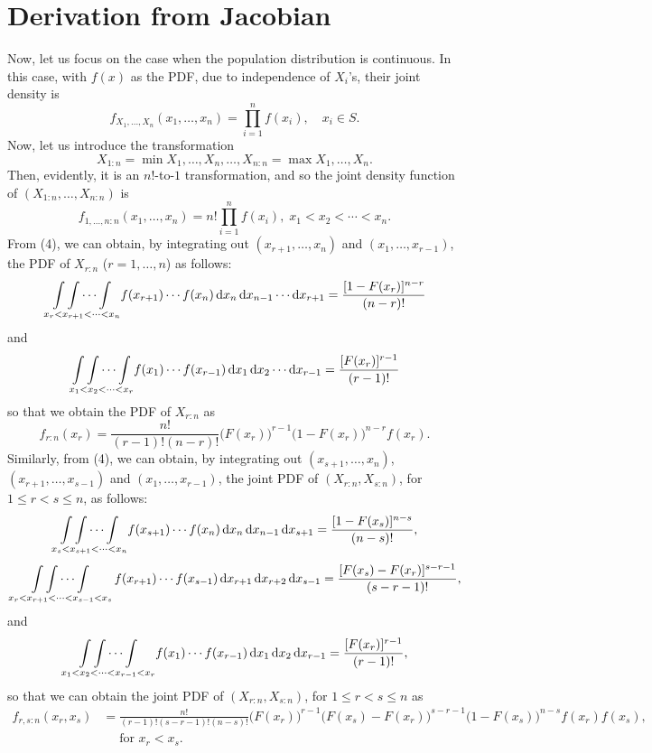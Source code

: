 \section*{Derivation from Jacobian}
Now, let us focus on the case when the population distribution is continuous. In this case, with $ f(x) $
as the PDF, due to independence of $ X_i $'s, their joint density is
\[ f_{X_1,\ldots,X_n}(x_1,\ldots,x_n)=\prod_{i=1}^{n}f(x_i),\quad x_i\in S. \]
Now, let us introduce the transformation
\[ X_{1:n}=\min{X_1,\ldots,X_n},\ldots,X_{n:n}=\max{X_1,\ldots,X_n}. \]
Then, evidently, it is an $ n! $-to-$ 1 $ transformation, and so the joint density
function of $ (X_{1:n},\ldots,X_{n:n}) $ is
\[ f_{1,\ldots,n:n}(x_1,\ldots,x_n)=n!\prod_{i=1}^{n}f(x_i),\; x_1<x_2<\cdots<x_n. \]
From (4), we can obtain, by integrating out $ (x_{r+1},\ldots,x_n) $ and $ (x_1,\ldots,x_{r-1}) $,
the PDF of $ X_{r:n} $ ($ r=1,\ldots,n $) as follows:
\[ \underset{x_r<x_{r+1}<\cdots<x_n}{\int\int\cdots\int}f(x_{r+1})\cdots f(x_n)\odif{x_n}\odif{x_{n-1}}\cdots\odif{x_{r+1}}=\frac{[1-F(x_r)]^{n-r}}{(n-r)!} \]
and
\[ \underset{x_1<x_2<\cdots<x_r}{\int\int\cdots\int}f(x_1)\cdots f(x_{r-1})\odif{x_1}\odif{x_{2}}\cdots\odif{x_{r-1}}=\frac{[F(x_r)]^{r-1}}{(r-1)!} \]
so that we obtain the PDF of $ X_{r:n} $ as
\[ f_{r:n}(x_r)=\frac{n!}{(r-1)!(n-r)!}\bigl(F(x_r)\bigr)^{r-1}\bigl(1-F(x_r)\bigr)^{n-r}f(x_r). \]
Similarly, from (4), we can obtain, by integrating out
$ (x_{s+1},\ldots,x_n) $, $ (x_{r+1},\ldots,x_{s-1}) $
and $ (x_1,\ldots,x_{r-1}) $, the joint PDF
of $ (X_{r:n},X_{s:n}) $, for $ 1\le r<s\le n $, as follows:
\[ \underset{x_s<x_{s+1}<\cdots<x_n}{\int\int\cdots\int}f(x_{s+1})\cdots f(x_n)\odif{x_n}\odif{x_{n-1}}\odif{x_{s+1}}=\frac{[1-F(x_s)]^{n-s}}{(n-s)!}, \]
\[ \mathop{\int\int\cdots\int}\limits_{x_r<x_{r+1}<\cdots<x_{s-1}<x_s}f(x_{r+1})\cdots f(x_{s-1})\odif{x_{r+1}}\odif{x_{r+2}}\odif{x_{s-1}}=\frac{[F(x_s)-F(x_r)]^{s-r-1}}{(s-r-1)!}, \]
and
\[ \underset{x_1<x_2<\cdots<x_{r-1}<x_r}{\int\int\cdots\int}f(x_{1})\cdots f(x_{r-1})\odif{x_1}\odif{x_2}\odif{x_{r-1}}=\frac{[F(x_r)]^{r-1}}{(r-1)!}, \]
so that we can obtain the joint PDF of $ (X_{r:n},X_{s:n}) $,
for $ 1\le r<s\le n $ as
\begin{align*}
    f_{r,s:n}(x_r,x_s) & =\frac{n!}{(r-1)!(s-r-1)!(n-s)!}\bigl(F(x_r)\bigr)^{r-1}\bigl(F(x_s)-F(x_r)\bigr)^{s-r-1}\bigl(1-F(x_s)\bigr)^{n-s}f(x_r)f(x_s), \\
                       & \quad\text{ for } x_r<x_s.
\end{align*}
